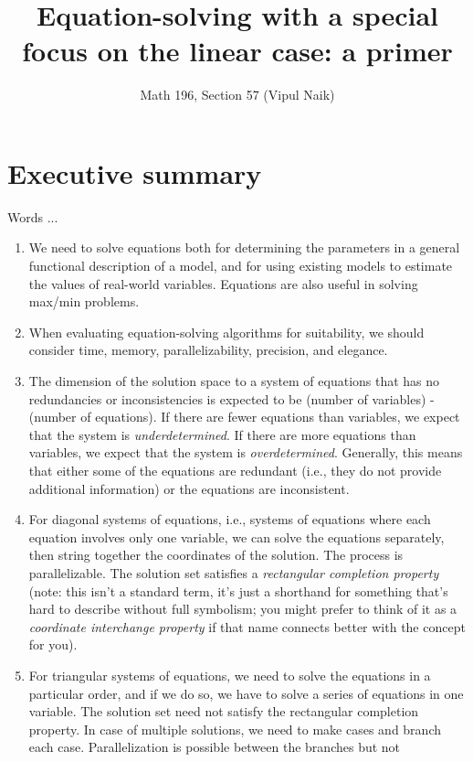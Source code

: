 \documentclass[10pt]{amsart}
\title{Equation-solving with a special focus on the linear case: a primer}
\author{Math 196, Section 57 (Vipul Naik)}
\begin{document}
\maketitle

\section*{Executive summary}

Words ...

\begin{enumerate}
\item We need to solve equations both for determining the parameters
  in a general functional description of a model, and for using
  existing models to estimate the values of real-world
  variables. Equations are also useful in solving max/min problems.
\item When evaluating equation-solving algorithms for suitability, we
  should consider time, memory, parallelizability, precision, and
  elegance.
\item The dimension of the solution space to a system of equations
  that has no redundancies or inconsistencies is expected to be
  (number of variables) - (number of equations). If there are fewer
  equations than variables, we expect that the system is {\em
    underdetermined}. If there are more equations than variables, we
  expect that the system is {\em overdetermined}. Generally, this
  means that either some of the equations are redundant (i.e., they do
  not provide additional information) or the equations are
  inconsistent.
\item For diagonal systems of equations, i.e., systems of equations
  where each equation involves only one variable, we can solve the
  equations separately, then string together the coordinates of the
  solution. The process is parallelizable. The solution set satisfies
  a {\em rectangular completion property} (note: this isn't a standard
  term, it's just a shorthand for something that's hard to describe
  without full symbolism; you might prefer to think of it as a {\em
    coordinate interchange property} if that name connects better with
  the concept for you).
\item For triangular systems of equations, we need to solve the
  equations in a particular order, and if we do so, we have to solve a
  series of equations in one variable. The solution set need not
  satisfy the rectangular completion property. In case of multiple
  solutions, we need to make cases and branch each
  case. Parallelization is possible between the branches but not

\end{enumerate}
\end{document}
